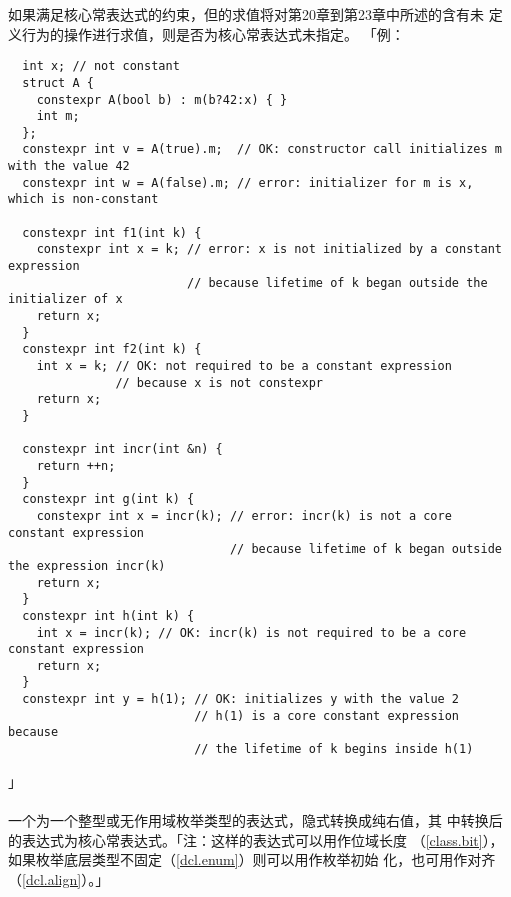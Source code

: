 如果满足核心常表达式的约束，但的求值将对第20章到第23章中所述的含有未
定义行为的操作进行求值，则是否为核心常表达式未指定。
「例：
\begin{lstlisting}
  int x; // not constant
  struct A {
    constexpr A(bool b) : m(b?42:x) { }
    int m;
  };
  constexpr int v = A(true).m;  // OK: constructor call initializes m with the value 42
  constexpr int w = A(false).m; // error: initializer for m is x, which is non-constant

  constexpr int f1(int k) {
    constexpr int x = k; // error: x is not initialized by a constant expression
                         // because lifetime of k began outside the initializer of x
    return x;
  }
  constexpr int f2(int k) {
    int x = k; // OK: not required to be a constant expression
               // because x is not constexpr
    return x;
  }

  constexpr int incr(int &n) {
    return ++n;
  }
  constexpr int g(int k) {
    constexpr int x = incr(k); // error: incr(k) is not a core constant expression
                               // because lifetime of k began outside the expression incr(k)
    return x;
  }
  constexpr int h(int k) {
    int x = incr(k); // OK: incr(k) is not required to be a core constant expression
    return x;
  }
  constexpr int y = h(1); // OK: initializes y with the value 2
                          // h(1) is a core constant expression because
                          // the lifetime of k begins inside h(1)
\end{lstlisting}」

\paragraph{}
一个为一个整型或无作用域枚举类型的表达式，隐式转换成纯右值，其
中转换后的表达式为核心常表达式。「注：这样的表达式可以用作位域长度
（\ref{class.bit}），如果枚举底层类型不固定（\ref{dcl.enum}）则可以用作枚举初始
化，也可用作对齐（\ref{dcl.align}）。」

